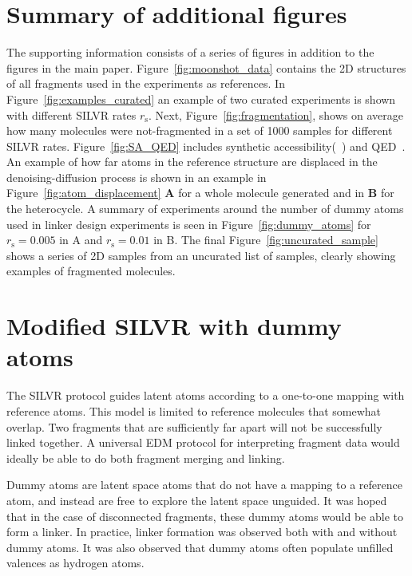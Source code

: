 \documentclass[journal=jacsat,manuscript=article]{achemso}
\begin{document}
\newpage 
\begin{suppinfo}

\section{Summary of additional figures }
The supporting information consists of a series of figures in addition to the figures in the main paper. Figure~\ref{fig:moonshot_data} contains the 2D structures of all fragments used in the experiments as references. In Figure~\ref{fig:examples_curated} an example of two curated experiments is shown with different SILVR rates $r_{\mathrm{s}}$. Next, Figure~\ref{fig:fragmentation}, shows on average how many molecules were not-fragmented in a set of 1000 samples for different SILVR rates. Figure~\ref{fig:SA_QED} includes synthetic accessibility(~\cite{ertl2009estimation}) and QED~\cite{bickerton2012quantifying, wildman1999prediction}. An example of how far atoms in the reference structure are displaced in the denoising-diffusion process is shown in an example in Figure~\ref{fig:atom_displacement} \textbf{A} for a whole molecule generated and in \textbf{B} for the heterocycle. A summary of experiments around the number of dummy atoms used in linker design experiments is seen in Figure~\ref{fig:dummy_atoms} for $r_{\mathrm{s}}=0.005$ in A and $r_{\mathrm{s}}=0.01$ in B.  The final Figure~\ref{fig:uncurated_sample} shows a series of 2D samples from an uncurated list of samples, clearly showing examples of fragmented molecules.  


\section{Modified SILVR with dummy atoms}
The SILVR protocol guides latent atoms according to a one-to-one mapping with reference atoms. This model is limited to reference molecules that somewhat overlap. Two fragments that are sufficiently far apart will not be successfully linked together. A universal EDM protocol for interpreting fragment data would ideally be able to do both fragment merging and linking.

Dummy atoms are latent space atoms that do not have a mapping to a reference atom, and instead are free to explore the latent space unguided. It was hoped that in the case of disconnected fragments, these dummy atoms would be able to form a linker. In practice, linker formation was observed both with and without dummy atoms. It was also observed that dummy atoms often populate unfilled valences as hydrogen atoms. 


\end{suppinfo}
\end{document}
